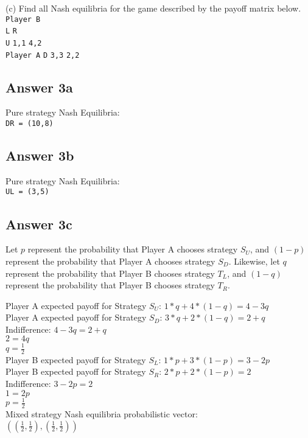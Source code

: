 \documentclass[twoside]{article}
\begin{document}
(c) Find all Nash equilibria for the game described by the payoff matrix below.\\

\hspace*{40mm}\texttt{Player B }\\
\hspace*{40mm}\texttt{L} \hspace*{15mm}\texttt{R}\\
\hspace*{24mm}\texttt{U} \hspace{12mm}\texttt{1,1} \hspace{12mm}\texttt{4,2}\\
\texttt{Player A} \hspace*{8mm}\texttt{D} \hspace{12mm}\texttt{3,3} \hspace{12mm}\texttt{2,2}\\

\subsection{Answer 3a}

Pure strategy Nash Equilibria: \\
\texttt{DR = (10,8)}

\subsection{Answer 3b}

Pure strategy Nash Equilibria: \\
\texttt{UL = (3,5)}

\subsection{Answer 3c}

Let $p$ represent the probability that Player A chooses strategy $S_{U}$, and $(1-p)$ represent the probability that Player A chooses strategy $S_{D}$. Likewise, let $q$ represent the probability that Player B chooses strategy $T_{L}$, and $(1-q)$ represent the probability that Player B chooses strategy $T_{R}$.

Player A expected payoff for Strategy $S_{U}$: $1*q + 4*(1-q) = 4 - 3q$ \\
Player A expected payoff for Strategy $S_{D}$: $3*q + 2*(1-q) = 2 + q$ \\
Indifference: 
$4 - 3q = 2 + q$ \\
$2 = 4q$ \\
$q = \frac{1}{2}$ \\

Player B expected payoff for Strategy $S_{L}$: $1*p + 3*(1-p) = 3 - 2p$ \\
Player B expected payoff for Strategy $S_{R}$: $2*p + 2*(1-p) = 2$ \\
Indifference: 
$3 - 2p = 2$ \\
$1 = 2p$ \\
$p = \frac{1}{2}$ \\

Mixed strategy Nash equilibria probabilistic vector: \\
$((\frac{1}{2}, \frac{1}{2}), (\frac{1}{2}, \frac{1}{2}))$
\end{document}
